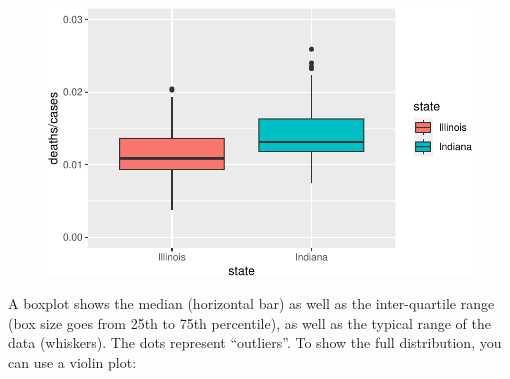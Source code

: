 \documentclass[
  letterpaper,
  DIV=11,
  numbers=noendperiod]{scrreprt}
\newenvironment{Shaded}{\begin{snugshade}}{\end{snugshade}}
\newcommand{\AttributeTok}[1]{\textcolor[rgb]{0.40,0.45,0.13}{#1}}
\newcommand{\CommentTok}[1]{\textcolor[rgb]{0.37,0.37,0.37}{#1}}
\newcommand{\DecValTok}[1]{\textcolor[rgb]{0.68,0.00,0.00}{#1}}
\newcommand{\FloatTok}[1]{\textcolor[rgb]{0.68,0.00,0.00}{#1}}
\newcommand{\FunctionTok}[1]{\textcolor[rgb]{0.28,0.35,0.67}{#1}}
\newcommand{\NormalTok}[1]{\textcolor[rgb]{0.00,0.23,0.31}{#1}}
\newcommand{\SpecialCharTok}[1]{\textcolor[rgb]{0.37,0.37,0.37}{#1}}
\newcommand{\StringTok}[1]{\textcolor[rgb]{0.13,0.47,0.30}{#1}}
\begin{document}
\begin{figure}[H]

{\centering \includegraphics{./01-dataviz_files/figure-pdf/unnamed-chunk-16-1.pdf}

}

\end{figure}

A boxplot shows the median (horizontal bar) as well as the
inter-quartile range (box size goes from 25th to 75th percentile), as
well as the typical range of the data (whiskers). The dots represent
``outliers''. To show the full distribution, you can use a violin plot:

\begin{Shaded}
\end{Shaded}
\end{document}
